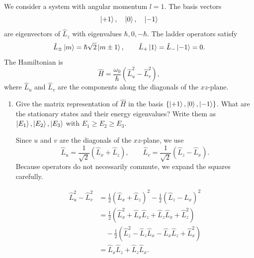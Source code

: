 \documentclass[11pt,a4paper]{scrartcl}
\newcommand{\op}[1]{\hat{#1}}
\begin{document}
    We consider a system with angular momentum $l=1$. The basis vectors
    \[
        \ket{+1},\quad \ket{0},\quad \ket{-1}
    \]
    are eigenvectors of $\op{L}_z$ with eigenvalues $\hbar,0,-\hbar$. The ladder operators satisfy
    \[
        \op{L}_{\pm}\ket{m}=\hbar\sqrt{2}\ket{m\pm 1},
        \qquad
        \op{L}_{+}\ket{1}=\op{L}_{-}\ket{-1}=0.
    \]
    The Hamiltonian is
    \[
        \op{H}=\frac{\omega_0}{\hbar}\left(\op{L}_u^2-\op{L}_v^2\right),
    \]
    where $\op{L}_u$ and $\op{L}_v$ are the components along the diagonals of the $xz$-plane.

    \begin{enumerate}[label=(\alph*)]
        \item Give the matrix representation of $\op{H}$ in the basis $\{\ket{+1},\ket{0},\ket{-1}\}$. What are the stationary states and their energy eigenvalues? Write them as $\ket{E_1},\ket{E_2},\ket{E_3}$ with $E_1\geq E_2\geq E_3$.

        \begin{calculationbox}
            Since $u$ and $v$ are the diagonals of the $xz$-plane, we use
            \[
                \op{L}_u=\frac{1}{\sqrt{2}}(\op{L}_x+\op{L}_z),
                \qquad
                \op{L}_v=\frac{1}{\sqrt{2}}(\op{L}_z-\op{L}_x).
            \]
            Because operators do not necessarily commute, we expand the squares carefully.

            \begin{calculationbox}
                \begin{align*}
                    \op{L}_u^2-\op{L}_v^2
                    &= \frac12(\op{L}_x+\op{L}_z)^2
                    -\frac12(\op{L}_z-\op{L}_x)^2 \\
                    &= \frac12\left(\op{L}_x^2+\op{L}_x\op{L}_z+\op{L}_z\op{L}_x+\op{L}_z^2\right) \\
                    &\quad -\frac12\left(\op{L}_z^2-\op{L}_z\op{L}_x-\op{L}_x\op{L}_z+\op{L}_x^2\right) \\
                    &= \op{L}_x\op{L}_z+\op{L}_z\op{L}_x.
                \end{align*}
            \end{calculationbox}


\end{calculationbox}
\end{enumerate}
\end{document}
